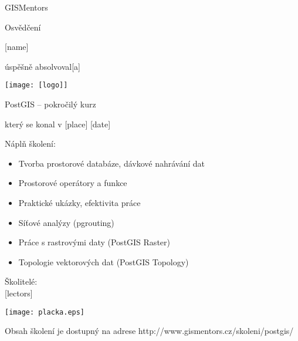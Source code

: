 \documentclass[12pt, a4paper]{letter}
\begin{document}
\pagestyle{empty}
\begin{center}

{\Large GISMentors}

{\Huge Osvědčení}

{\Large [name]}

úspěšně absolvoval[a]

\texttt{[image: [logo]]}

{\Large PostGIS -- pokročilý kurz}

který se konal v [place] [date]
\end{center}

Náplň školení:

\begin{itemize}
\item Tvorba prostorové databáze, dávkové nahrávání dat
\item Prostorové operátory a funkce
\item Praktické ukázky, efektivita práce
\item Síťové analýzy (pgrouting)
\item Práce s rastrovými daty (PostGIS Raster)
\item Topologie vektorových dat (PostGIS Topology)
\end{itemize}

\vfill
\parbox{7cm}{

    Školitelé: \\

    [lectors]
}
\hfill
\parbox{3cm}{
    \texttt{[image: placka.eps]}
}


\begin{center}
{\footnotesize Obsah školení je dostupný na adrese
http://www.gismentors.cz/skoleni/postgis/}
\end{center}
\end{document}

